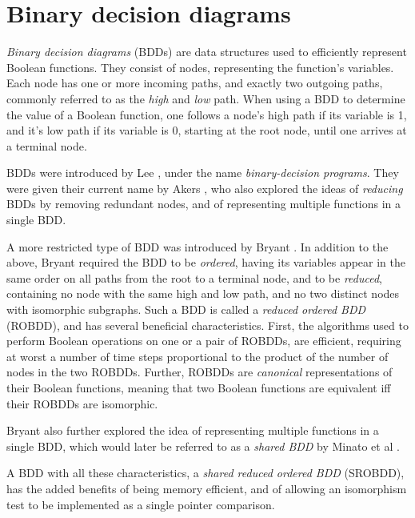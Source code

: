 \documentclass[a4paper,11pt]{kth-mag}
\begin{document}
\cite{crick_thesis}

\section{Binary decision diagrams}

\emph{Binary decision diagrams} (BDDs) are data structures used to efficiently represent Boolean functions.
They consist of nodes, representing the function's variables. Each node has one or more incoming paths, and exactly two outgoing paths, commonly referred to as the \emph{high} and \emph{low} path.
When using a BDD to determine the value of a Boolean function, one follows a node's high path if its variable is 1, and it's low path if its variable is 0, starting at the root node, until one arrives at a terminal node.

BDDs were introduced by Lee \cite{lee59}, under the name \emph{binary-decision programs}.
They were given their current name by Akers \cite{akers78}, who also explored the ideas of \emph{reducing} BDDs by removing redundant nodes, and of representing multiple functions in a single BDD.

A more restricted type of BDD was introduced by Bryant \cite{bryant86}.
In addition to the above, Bryant required the BDD to be \emph{ordered}, having its variables appear in the same order on all paths from the root to a terminal node,
and to be \emph{reduced}, containing no node with the same high and low path, and no two distinct nodes with isomorphic subgraphs.
Such a BDD is called a \emph{reduced ordered BDD} (ROBDD), and has several beneficial characteristics.
First, the algorithms used to perform Boolean operations on one or a pair of ROBDDs, are efficient, requiring at worst a number of time steps proportional to the product of the number of nodes in the two ROBDDs.
Further, ROBDDs are \emph{canonical} representations of their Boolean functions, meaning that two Boolean functions are equivalent iff their ROBDDs are isomorphic.

Bryant also further explored the idea of representing multiple functions in a single BDD, which would later be referred to as a \emph{shared BDD} by Minato et al \cite{minato90}.

A BDD with all these characteristics, a \emph{shared reduced ordered BDD} (SROBDD), has the added benefits of being memory efficient, and of allowing an isomorphism test to be implemented as a single pointer comparison.
\end{document}
